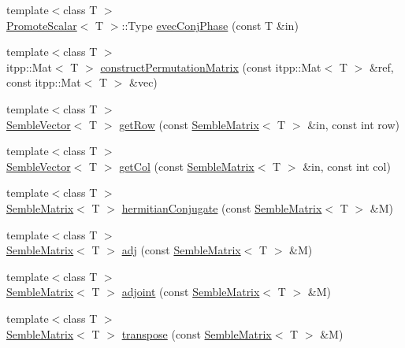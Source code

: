 \begin{DoxyCompactItemize}
\item 
{\footnotesize template$<$class T $>$ }\\\mbox{\hyperlink{structSEMBLE_1_1PromoteScalar}{Promote\+Scalar}}$<$ T $>$\+::Type \mbox{\hyperlink{namespaceSEMBLE_a0c3011d7bbdc3f7abab3fda010549fa6}{evec\+Conj\+Phase}} (const T \&in)
\item 
{\footnotesize template$<$class T $>$ }\\itpp\+::\+Mat$<$ T $>$ \mbox{\hyperlink{namespaceSEMBLE_a7dfb8a829dce183cd58e280bd3fdd55c}{construct\+Permutation\+Matrix}} (const itpp\+::\+Mat$<$ T $>$ \&ref, const itpp\+::\+Mat$<$ T $>$ \&vec)
\item 
{\footnotesize template$<$class T $>$ }\\\mbox{\hyperlink{structSEMBLE_1_1SembleVector}{Semble\+Vector}}$<$ T $>$ \mbox{\hyperlink{namespaceSEMBLE_a06728ccc5290996ba307579f58f449cf}{get\+Row}} (const \mbox{\hyperlink{structSEMBLE_1_1SembleMatrix}{Semble\+Matrix}}$<$ T $>$ \&in, const int row)
\item 
{\footnotesize template$<$class T $>$ }\\\mbox{\hyperlink{structSEMBLE_1_1SembleVector}{Semble\+Vector}}$<$ T $>$ \mbox{\hyperlink{namespaceSEMBLE_ad20cc941d312a015ac7af98d54a39c9d}{get\+Col}} (const \mbox{\hyperlink{structSEMBLE_1_1SembleMatrix}{Semble\+Matrix}}$<$ T $>$ \&in, const int col)
\item 
{\footnotesize template$<$class T $>$ }\\\mbox{\hyperlink{structSEMBLE_1_1SembleMatrix}{Semble\+Matrix}}$<$ T $>$ \mbox{\hyperlink{namespaceSEMBLE_a053770bae7a7361192307920b447233d}{hermitian\+Conjugate}} (const \mbox{\hyperlink{structSEMBLE_1_1SembleMatrix}{Semble\+Matrix}}$<$ T $>$ \&M)
\item 
{\footnotesize template$<$class T $>$ }\\\mbox{\hyperlink{structSEMBLE_1_1SembleMatrix}{Semble\+Matrix}}$<$ T $>$ \mbox{\hyperlink{namespaceSEMBLE_a2130d074e5c638bf8a6c280b531dd021}{adj}} (const \mbox{\hyperlink{structSEMBLE_1_1SembleMatrix}{Semble\+Matrix}}$<$ T $>$ \&M)
\item 
{\footnotesize template$<$class T $>$ }\\\mbox{\hyperlink{structSEMBLE_1_1SembleMatrix}{Semble\+Matrix}}$<$ T $>$ \mbox{\hyperlink{namespaceSEMBLE_ae4a69147c0dfbe37318cae10b6a753e7}{adjoint}} (const \mbox{\hyperlink{structSEMBLE_1_1SembleMatrix}{Semble\+Matrix}}$<$ T $>$ \&M)
\item 
{\footnotesize template$<$class T $>$ }\\\mbox{\hyperlink{structSEMBLE_1_1SembleMatrix}{Semble\+Matrix}}$<$ T $>$ \mbox{\hyperlink{namespaceSEMBLE_a08b33ff750c44b9463291dd6c05079aa}{transpose}} (const \mbox{\hyperlink{structSEMBLE_1_1SembleMatrix}{Semble\+Matrix}}$<$ T $>$ \&M)

\end{DoxyCompactItemize}
